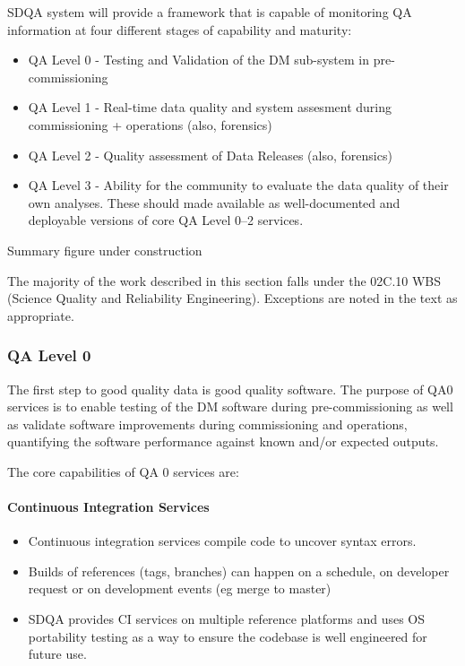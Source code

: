 SDQA system will provide a framework that is capable of monitoring QA
information at four different stages of capability and maturity:

\begin{itemize}
\item QA Level 0 - Testing and Validation of the DM sub-system in pre-commissioning
\item QA Level 1 - Real-time data quality and system assesment during commissioning + operations (also, forensics)
\item QA Level 2 - Quality assessment of Data Releases (also, forensics)
\item QA Level 3 - Ability for the community to evaluate the data quality of their own analyses. These should made available as well-documented and deployable versions of core QA Level 0--2 services.
\end{itemize}

\begin{note}
Summary figure under construction
\end{note}

The majority of the work described in this section falls under the
02C.10 WBS (Science Quality and Reliability Engineering). Exceptions
are noted in the text as appropriate.

\subsubsection{QA Level 0}

The first step to good quality data is good quality software. The
purpose of QA0 services is to enable testing of the DM software during
pre-commissioning as well as validate software improvements during
commissioning and operations, quantifying the software performance
against known and/or expected outputs.

The core capabilities of QA 0 services are:

\paragraph{Continuous Integration Services}
\label{sec:qaCI}
\begin{itemize}

\item Continuous integration services compile code to uncover syntax errors.

\item Builds of references (tags, branches) can happen on a schedule, on developer request or on development events (eg merge to master)

\item SDQA provides CI services on multiple reference platforms and uses OS portability testing as a way to ensure the codebase is well engineered for future use.

\end{itemize}

